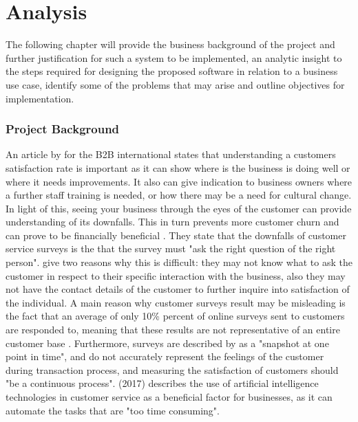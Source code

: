 \chapter{Analysis }

The following chapter will provide the business background of the project and further justification for such a system to be implemented, an analytic insight to the steps required for designing the proposed software in relation to a business use case, identify some of the problems that may arise and outline objectives for implementation.

\subsection*{Project Background}
An article by \citeauthor{hague} for the B2B international states that understanding a customers satisfaction rate is important as it can show where is the business is doing well or where it needs improvements. It also can give indication to business owners where a further staff training is needed, or how there may be a need for cultural change. In light of this, seeing your business through the eyes of the customer can provide understanding of its downfalls. This in turn prevents more customer churn and can prove to be financially beneficial \citep{hague}. They state that the downfalls of customer service surveys is the that the survey must "ask the right question of the right person". \citeauthor{hague} give two reasons why this is difficult: they may not know what to ask the customer in respect to their specific interaction with the business, also they may not have the contact details of the customer to further inquire into satisfaction of the individual. A main reason why customer surveys result may be misleading is the fact that an average of only 10\% percent of online surveys sent to customers are responded to, meaning that these results are not representative of an entire customer base \citep{willott} . Furthermore, surveys are described by \citeauthor{hague} as a "snapshot at one point in time", and do not accurately represent the feelings of the customer during transaction process, and measuring the satisfaction of customers should "be a continuous process". \citeauthor{keith} (2017) describes the use of artificial intelligence technologies in customer service as a beneficial factor for businesses, as it can automate the tasks that are "too time consuming".

